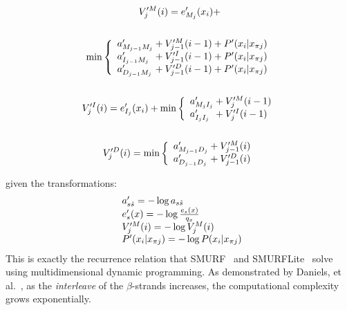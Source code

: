 \documentclass[blockstyle,times,preprint]{sigplanconf}
\begin{document}
\begin{small}
\begin{multline}\label{viterbi-final}
V_{j}^{\prime M}(i) = e^{\prime}_{M_{j}}(x_{i}) + \notag
\\\notag\\ \min \left\{
  \begin{array}{l@{}c@{}l}
  \vsum{V_{j-1}^{\prime M}(i-1)} {a^{\prime}_{M_{j-1}M_{j}}} + P'(x_{i}|x_{\pi j})\\
  \vsum{V_{j-1}^{\prime I}(i-1)} {a^{\prime}_{I_{j-1}M_{j}}} + P'(x_{i}|x_{\pi j})\\
  \vsum{V_{j-1}^{\prime D}(i-1)} {a^{\prime}_{D_{j-1}M_{j}}} + P'(x_{i}|x_{\pi j})\\
  \end{array} \right.\\\\
V_{j}^{\prime I}(i) = e^{\prime}_{I_{j}}(x_{i}) + \min \left\{
  \begin{array}{l@{}c@{}l}
  \vsum{V_{j}^{\prime M}(i - 1)} {a^{\prime}_{M_{j}I_{j}}}\\
  \vsum{V_{j}^{\prime I}(i - 1)} {a^{\prime}_{I_{j}I_{j}}}\\
  \end{array} \right.\\\\
V_{j}^{\prime D}(i) = \min \left\{
  \begin{array}{l@{}c@{}l}
  \vsum{V_{j-1}^{\prime M}(i)} {a^{\prime}_{M_{j-1}D_{j}}}\\
  \vsum{V_{j-1}^{\prime D}(i)} {a^{\prime}_{D_{j-1}D_{j}}}\\
  \end{array} \right.\\
\end{multline}
\end{small}
given the transformations:
\begin{equation*}
  \begin{array}{l@{}c@{}l@{}}
  a'_{s \hat{s}} = - \log a_{s \hat{s}} \\
  e^{\prime}_{s}(x) = - \log\frac{e_{s}(x)}{q_{x}}\\
  V_j^{\prime M}(i) = - \log V_j^{M}(i)\\
  P^{\prime}(x_{i}|x_{\pi j}) = - \log P(x_{i}|x_{\pi j})
  \end{array}\\
\end{equation*}
This is exactly the recurrence relation that SMURF~\cite{Menke:2010ti} and 
SMURFLite~\cite{Daniels:2012dg} solve using multidimensional dynamic 
programming.
As demonstrated by Daniels, et al.~\cite{Daniels:2012dg}, as the 
\emph{interleave} 
of the $\beta$-strands increases, the computational complexity grows 
exponentially.
\end{document}
